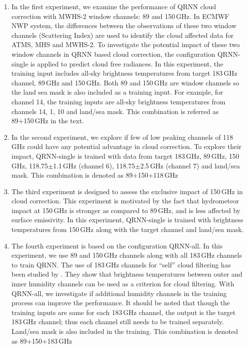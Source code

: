 \documentclass[amt, manuscript]{copernicus}
\begin{document}
\begin{enumerate}
	
	\item In the first experiment, we examine the performance of QRNN cloud correction with MWHS-2 window channels: 89 and 150\,GHz. In ECMWF NWP system, the differences between the observations of these two window channels (Scattering Index) \citep{Lu2015FY3C} are used to identify the cloud affected data for ATMS, MHS and MWHS-2. To investigate the potential impact of these two window channels in QRNN based cloud correction, the configuration QRNN-single is applied to predict cloud free radiances. In this experiment, the training input includes all-sky brightness temperatures from target 183\,GHz channel, 89\,GHz and 150\,GHz. Both 89 and 150\,GHz are window channels so the land sea mask is also included as a training input. For example, for channel 14, the training inputs are all-sky brightness temperatures from channels 14, 1, 10 and land/sea mask. This combination is referred as 89+150\,GHz in the text.
	
	\item In the second experiment, we explore if few of low peaking channels of 118\,GHz could have any potential advantage in cloud correction. To explore their impact, QRNN-single is trained with data from target 183\,GHz, 89\,GHz, 150\,GHz, 118.75$\pm$1.1\,GHz (channel 6), 118.75$\pm$2.5\,GHz (channel 7) and land/sea mask. This combination is denoted as 89+150+118\,GHz
	
	\item The third experiment is designed to assess the exclusive impact of 150\,GHz in cloud correction. This experiment is motivated by the fact that hydrometeor impact at 150\,GHz is stronger as compared to 89\,GHz, and is less affected by surface emissivity. In this experiment, QRNN-single is trained with brightness temperatures from 150\,GHz along with the target channel and land/sea mask. 
	
	\item The fourth experiment is based on the configuration QRNN-all. In this experiment, we use 89 and 150\,GHz channels along with all 183\,GHz channels to train QRNN. The use of 183\,GHz channels for ``self'' cloud filtering has been studied by  \citet{buehler:aclou:07}. They show that brightness temperatures between outer and inner humidity channels can be used as a criterion for cloud filtering. With QRNN-all, we investigate if additional humidity channels in the training process can improve the performance. It should be noted that though the training inputs are same for each 183\,GHz channel, the output is the target 183\,GHz channel; thus each channel still needs to be trained separately. Land/sea mask is also included in the training. This combination is denoted as 89+150+183\,GHz
\end{enumerate}
\end{document}
